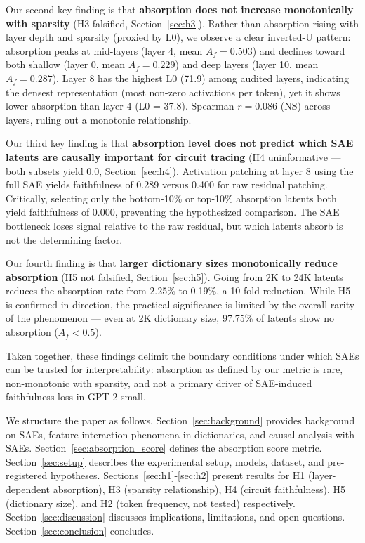 \documentclass{article}
\begin{document}
Our second key finding is that \textbf{absorption does not increase monotonically with sparsity} (H3 falsified, Section~\ref{sec:h3}). Rather than absorption rising with layer depth and sparsity (proxied by L0), we observe a clear inverted-U pattern: absorption peaks at mid-layers (layer 4, mean $A_f = 0.503$) and declines toward both shallow (layer 0, mean $A_f = 0.229$) and deep layers (layer 10, mean $A_f = 0.287$). Layer 8 has the highest L0 (71.9) among audited layers, indicating the densest representation (most non-zero activations per token), yet it shows lower absorption than layer 4 (L0 = 37.8). Spearman $r = 0.086$ (NS) across layers, ruling out a monotonic relationship.

Our third key finding is that \textbf{absorption level does not predict which SAE latents are causally important for circuit tracing} (H4 uninformative --- both subsets yield 0.0, Section~\ref{sec:h4}). Activation patching at layer 8 using the full SAE yields faithfulness of 0.289 versus 0.400 for raw residual patching. Critically, selecting only the bottom-10\% or top-10\% absorption latents both yield faithfulness of 0.000, preventing the hypothesized comparison. The SAE bottleneck loses signal relative to the raw residual, but which latents absorb is not the determining factor.

Our fourth finding is that \textbf{larger dictionary sizes monotonically reduce absorption} (H5 not falsified, Section~\ref{sec:h5}). Going from 2K to 24K latents reduces the absorption rate from 2.25\% to 0.19\%, a 10-fold reduction. While H5 is confirmed in direction, the practical significance is limited by the overall rarity of the phenomenon --- even at 2K dictionary size, 97.75\% of latents show no absorption ($A_f < 0.5$).

Taken together, these findings delimit the boundary conditions under which SAEs can be trusted for interpretability: absorption as defined by our metric is rare, non-monotonic with sparsity, and not a primary driver of SAE-induced faithfulness loss in GPT-2 small.

We structure the paper as follows. Section~\ref{sec:background} provides background on SAEs, feature interaction phenomena in dictionaries, and causal analysis with SAEs. Section~\ref{sec:absorption_score} defines the absorption score metric. Section~\ref{sec:setup} describes the experimental setup, models, dataset, and pre-registered hypotheses. Sections~\ref{sec:h1}-\ref{sec:h2} present results for H1 (layer-dependent absorption), H3 (sparsity relationship), H4 (circuit faithfulness), H5 (dictionary size), and H2 (token frequency, not tested) respectively. Section~\ref{sec:discussion} discusses implications, limitations, and open questions. Section~\ref{sec:conclusion} concludes.
\end{document}
